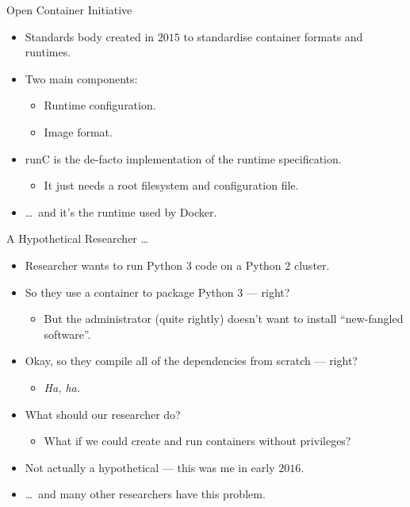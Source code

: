 \documentclass[10pt,aspectratio=169]{beamer}
\begin{document}
	\begin{frame}{Open Container Initiative}
		\begin{itemize}
			\item Standards body created in $2015$ to standardise container formats and runtimes.
			\item Two main components:
			\begin{itemize}
				\item Runtime configuration.
				\item Image format.
			\end{itemize}
			\item runC is the de-facto implementation of the runtime specification.
			\begin{itemize}
				\item It just needs a root filesystem and configuration file.
			\end{itemize}
			\item \dots~and it's the runtime used by Docker.
		\end{itemize}
	\end{frame}

	\begin{frame}{A Hypothetical Researcher \dots}
		\begin{itemize}
			\item Researcher wants to run Python 3 code on a Python 2 cluster.
			\item<2-> So they use a container to package Python 3 --- right?
			\begin{itemize}
				\item<2-> But the administrator (quite rightly) doesn't want to install ``new-fangled software''.
			\end{itemize}
			\item<3-> Okay, so they compile all of the dependencies from scratch --- right?
			\begin{itemize}
				\item<3-> \textit{Ha, ha.}
			\end{itemize}
			\item<4-> What should our researcher do?
			\begin{itemize}
				\item<4-> What if we could create and run containers without privileges?
			\end{itemize}
			\item<5-> Not actually a hypothetical --- this was me in early $2016$.
			\item<5-> \dots~and many other researchers have this problem.
		\end{itemize}
	\end{frame}
\end{document}

